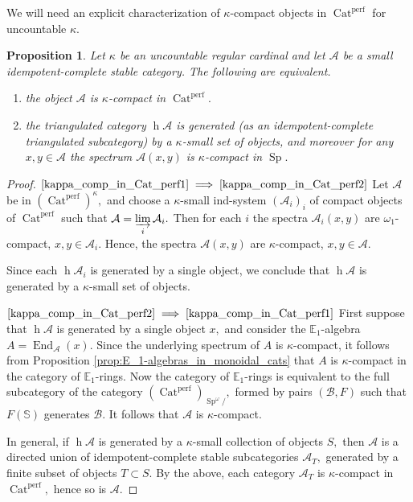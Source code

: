 \documentclass[11pt,leqno]{amsart}
\newcommand{\Implies}[2]{$\text{\ref{#1}}\implies\text{\ref{#2}}$}
\newtheorem{prop}[theo]{Proposition}
\numberwithin{equation}{section}
\def\bS{\mathbb{S}}
\def\h{\operatorname{h}}
\def\End{\operatorname{End}}
\newcommand{\indlim}[1][]{\mathop{\varinjlim}\limits_{#1}}
\newcommand{\Cat}{\operatorname{Cat}}
\newcommand{\st}{\operatorname{st}}
\newcommand{\dual}{\operatorname{dual}}
\newcommand{\bE}{{\mathbb E}}
\newcommand{\cA}{{\mathcal A}}
\newcommand{\cB}{{\mathcal B}}
\newcommand{\perf}{\operatorname{perf}}
\newcommand{\Sp}{\operatorname{Sp}}
\newcommand{\Ind}{\operatorname{Ind}}
\begin{document}
We will need an explicit characterization of $\kappa$-compact objects in $\Cat^{\perf}$ for uncountable $\kappa.$ %

\begin{prop}\label{prop:kappa_compact_small_cats} Let $\kappa$ be an uncountable regular cardinal and let $\cA$ be a small idempotent-complete stable category. The following are equivalent.

\begin{enumerate}[label=(\roman*),ref=(\roman*)]
\item the object $\cA$ is $\kappa$-compact in $\Cat^{\perf}.$ \label{kappa_comp_in_Cat_perf1}


\item the triangulated category $\h\cA$ is generated (as an idempotent-complete triangulated subcategory) by a $\kappa$-small set of objects, and moreover for any $x,y\in\cA$ the spectrum $\cA(x,y)$ is $\kappa$-compact in $\Sp.$ \label{kappa_comp_in_Cat_perf2}
\end{enumerate}
\end{prop}

\begin{proof} \Implies{kappa_comp_in_Cat_perf1}{kappa_comp_in_Cat_perf2} Let $\cA$ be in $(\Cat^{\perf})^{\kappa},$ and choose a $\kappa$-small ind-system $(\cA_i)_i$ of compact objects of $\Cat^{\perf}$ such that $\cA=\indlim[i]\cA_i.$ Then for each $i$ the spectra $\cA_i(x,y)$ are $\omega_1$-compact, $x,y\in\cA_i$. Hence, the spectra $\cA(x,y)$ are $\kappa$-compact, $x,y\in\cA.$

Since each $\h\cA_i$ is generated by a single object, we conclude that $\h\cA$ is generated by a $\kappa$-small set of objects.

\Implies{kappa_comp_in_Cat_perf2}{kappa_comp_in_Cat_perf1} First suppose that $\h\cA$ is generated by a single object $x,$ and consider the $\bE_1$-algebra $A=\End_{\cA}(x).$ Since the underlying spectrum of $A$ is $\kappa$-compact, it follows from Proposition \ref{prop:E_1-algebras_in_monoidal_cats} that $A$ is $\kappa$-compact in the category of $\bE_1$-rings. Now the category of $\bE_1$-rings is equivalent to the full subcategory of the category $(\Cat^{\perf})_{\Sp^{\omega}/},$ formed by pairs $(\cB,F)$ such that $F(\bS)$ generates $\cB.$ It follows that $\cA$ is $\kappa$-compact.

In general, if $\h\cA$ is generated by a $\kappa$-small collection of objects $S,$ then $\cA$ is a directed union of idempotent-complete stable subcategories $\cA_T,$ generated by a finite subset of objects $T\subset S.$ By the above, each category $\cA_T$ is $\kappa$-compact in $\Cat^{\perf},$ hence so is $\cA.$ 
\end{proof}
\end{document}
